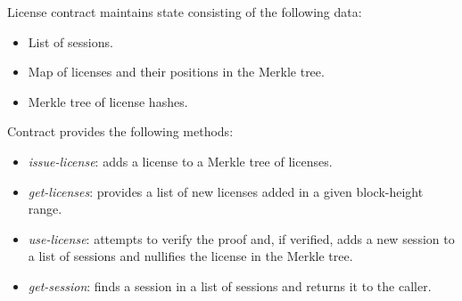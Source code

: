 
\begin{flushleft}
	License contract maintains state consisting of the following data:
\end{flushleft}

\begin{itemize}%
	\item List of sessions.
	\item Map of licenses and their positions in the Merkle tree.
	\item Merkle tree of license hashes.
\end{itemize}


\begin{flushleft}
	Contract provides the following methods:
\end{flushleft}

\begin{itemize}%
	\item \textit{issue-license}: adds a license to a Merkle tree of licenses.
	\item \textit{get-licenses}: provides a list of new licenses added in a given block-height range.
	\item \textit{use-license}: attempts to verify the proof and, if verified, adds a new session to a list of sessions and nullifies the license in the Merkle tree.
	\item \textit{get-session}: finds a session in a list of sessions and returns it to the caller.
\end{itemize}

